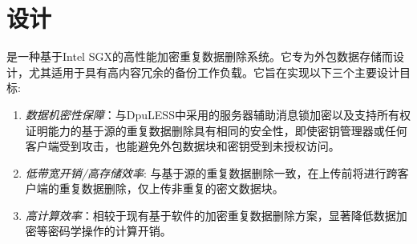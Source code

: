 \section{\sysname 设计}
\label{sec:design}


\sysname 是一种基于Intel SGX的高性能加密重复数据删除系统。它专为外包数据存储而设计，尤其适用于具有高内容冗余的备份工作负载。它旨在实现以下三个主要设计目标:
\begin{enumerate}
    \item \textit{数据机密性保障}：与DpuLESS\cite{bellare13b}中采用的服务器辅助消息锁加密以及支持所有权证明\cite{halevi11}能力的基于源的重复数据删除具有相同的安全性，即使密钥管理器或任何客户端受到攻击，\sysname 也能避免外包数据块和密钥受到未授权访问。
    \item \textit{低带宽开销/高存储效率}: 与基于源的重复数据删除一致，\sysname 在上传前将进行跨客户端的重复数据删除，仅上传非重复的密文数据块。
    \item \textit{高计算效率}：相较于现有基于软件的加密重复数据删除方案，\sysname 显著降低数据加密等密码学操作的计算开销。
\end{enumerate}





